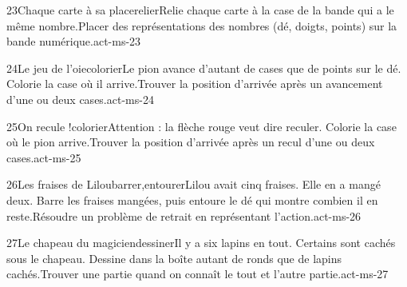\begin{activite}{23}{Chaque carte à sa place}{relier}{Relie chaque carte à la case de la bande qui a le {\otBold\color{otNavy}même nombre}.}{Placer des représentations des nombres (dé, doigts, points) sur la bande numérique.}{act-ms-23}
\end{activite}
\begin{activite}{24}{Le jeu de l’oie}{colorier}{Le pion avance d’autant de cases que de points sur le dé. Colorie la case où il {\otBold\color{otNavy}arrive}.}{Trouver la position d’arrivée après un avancement d’une ou deux cases.}{act-ms-24}
\end{activite}
\begin{activite}{25}{On recule !}{colorier}{Attention : la flèche rouge veut dire {\otBold\color{otNavy}reculer}. Colorie la case où le pion arrive.}{Trouver la position d’arrivée après un recul d’une ou deux cases.}{act-ms-25}
\end{activite}
\begin{activite}{26}{Les fraises de Lilou}{barrer,entourer}{Lilou avait cinq fraises. Elle en a mangé deux. {\otBold\color{otNavy}Barre} les fraises mangées, puis entoure le dé qui montre combien il en reste.}{Résoudre un problème de retrait en représentant l’action.}{act-ms-26}
\end{activite}
\begin{activite}{27}{Le chapeau du magicien}{dessiner}{Il y a six lapins en tout. Certains sont cachés sous le chapeau. {\otBold\color{otNavy}Dessine} dans la boîte autant de ronds que de lapins cachés.}{Trouver une partie quand on connaît le tout et l’autre partie.}{act-ms-27}
\end{activite}

